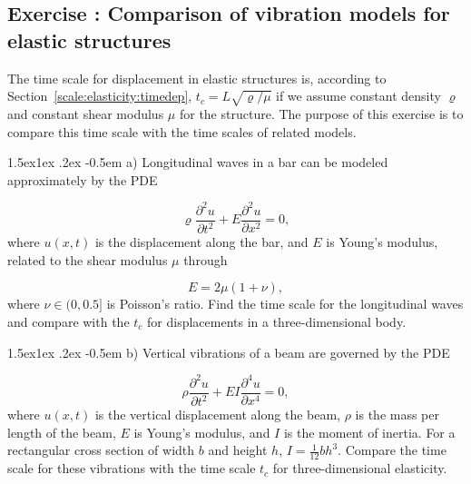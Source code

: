 \documentclass[graybox,envcountchap,sectrefs,final]{svmonodo}
\makeatletter
\newcounter{doconce:movie:counter}
\newenvironment{doconceexercise}{}{}
\newcounter{doconceexercisecounter}
\newcommand\subex{\@startsection{paragraph}{4}{\z@}%
                  {1.5ex\@plus1ex \@minus.2ex}%
                  {-0.5em}%
                  {\normalfont\normalsize\bfseries}}
\makeatother
\begin{document}
\begin{doconceexercise}

\subsection*{Exercise \thedoconceexercisecounter: Comparison of vibration models for elastic structures}

\label{scale::exer:elasticity:vibmodels}

The time scale for displacement in elastic structures is, according to
Section~\ref{scale:elasticity:timedep}, $t_c=L\sqrt{\varrho/\mu}$ if we
assume constant density $\varrho$ and constant shear modulus $\mu$ for
the structure. The purpose of this exercise is to compare this time
scale with the time scales of related models.


\subex{a)}
Longitudinal waves in a bar can be modeled approximately by the PDE

\[ \varrho\frac{\partial^2 u}{\partial t^2} + E\frac{\partial^2 u}{\partial x^2} = 0,\]
where $u(x,t)$ is the displacement along the bar, and $E$ is Young's modulus,
related to the shear modulus $\mu$ through

\[ E = 2\mu (1+\nu),\]
where $\nu\in (0,0.5]$ is Poisson's ratio.
Find the time scale for the longitudinal waves and compare with the $t_c$
for displacements in a three-dimensional body.



\subex{b)}
Vertical vibrations of a beam are governed by the PDE

\[ \rho\frac{\partial^2 u}{\partial t^2} + EI\frac{\partial^4 u}{\partial x^4} = 0,\]
where $u(x,t)$ is the vertical displacement along the beam,
$\rho$ is the mass per length of the beam,
$E$ is Young's modulus, and $I$ is the moment of inertia. For a
rectangular cross section of width $b$ and height $h$, $I=\frac{1}{12}bh^3$.
Compare the time scale for these vibrations with the time scale $t_c$
for three-dimensional elasticity.



\end{doconceexercise}
\end{document}
